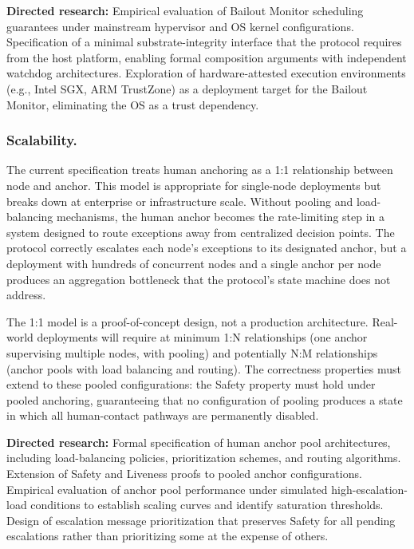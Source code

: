 \textbf{Directed research:} Empirical evaluation of Bailout Monitor scheduling guarantees under mainstream hypervisor and OS kernel configurations. Specification of a minimal substrate-integrity interface that the protocol requires from the host platform, enabling formal composition arguments with independent watchdog architectures. Exploration of hardware-attested execution environments (e.g., Intel SGX, ARM TrustZone) as a deployment target for the Bailout Monitor, eliminating the OS as a trust dependency.

\subsubsection{Scalability.}
The current specification treats human anchoring as a 1:1 relationship between node and anchor. This model is appropriate for single-node deployments but breaks down at enterprise or infrastructure scale. Without pooling and load-balancing mechanisms, the human anchor becomes the rate-limiting step in a system designed to route exceptions away from centralized decision points. The protocol correctly escalates each node's exceptions to its designated anchor, but a deployment with hundreds of concurrent nodes and a single anchor per node produces an aggregation bottleneck that the protocol's state machine does not address.

The 1:1 model is a proof-of-concept design, not a production architecture. Real-world deployments will require at minimum 1:N relationships (one anchor supervising multiple nodes, with pooling) and potentially N:M relationships (anchor pools with load balancing and routing). The correctness properties must extend to these pooled configurations: the Safety property must hold under pooled anchoring, guaranteeing that no configuration of pooling produces a state in which all human-contact pathways are permanently disabled.

\textbf{Directed research:} Formal specification of human anchor pool architectures, including load-balancing policies, prioritization schemes, and routing algorithms. Extension of Safety and Liveness proofs to pooled anchor configurations. Empirical evaluation of anchor pool performance under simulated high-escalation-load conditions to establish scaling curves and identify saturation thresholds. Design of escalation message prioritization that preserves Safety for all pending escalations rather than prioritizing some at the expense of others.

